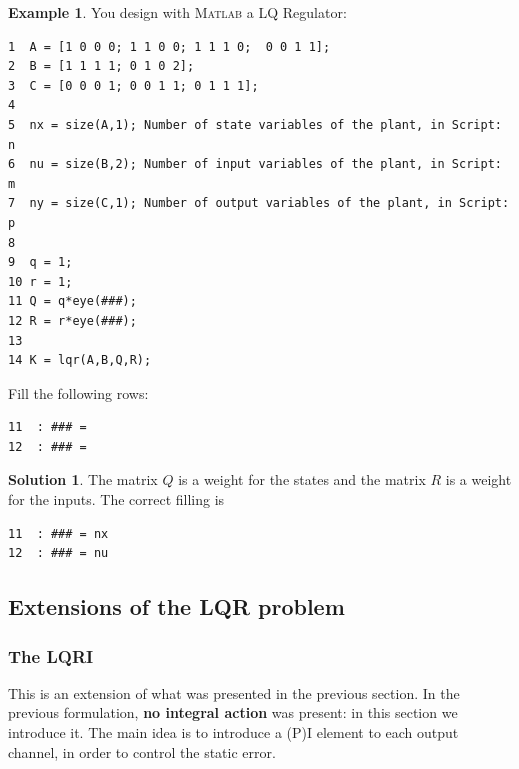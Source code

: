 \documentclass[a4paper,12 pt]{article}
\numberwithin{equation}{section}
\theoremstyle{definition}
\newtheorem{bsp}{Example}
\theoremstyle{remark}
\theoremstyle{definition}
\newtheorem*{lsg}{Solution}
\theoremstyle{definition}
\theoremstyle{definition}
\theoremstyle{remark}
\begin{document}
\newpage

\begin{bsp}
You design with \textsc{Matlab} a LQ Regulator:
\begin{verbatim}
1  A = [1 0 0 0; 1 1 0 0; 1 1 1 0;  0 0 1 1];
2  B = [1 1 1 1; 0 1 0 2];
3  C = [0 0 0 1; 0 0 1 1; 0 1 1 1];
4
5  nx = size(A,1); Number of state variables of the plant, in Script: n
6  nu = size(B,2); Number of input variables of the plant, in Script: m
7  ny = size(C,1); Number of output variables of the plant, in Script: p
8 
9  q = 1;
10 r = 1;
11 Q = q*eye(###);
12 R = r*eye(###);
13
14 K = lqr(A,B,Q,R);

\end{verbatim}
Fill the following rows:\\
\begin{verbatim}
11  : ### = 
12  : ### = 
\end{verbatim}
\newpage
\begin{lsg}
The matrix $Q$ is a weight for the states and the matrix $R$ is a weight for the inputs. The correct filling is
\begin{verbatim}
11  : ### = nx 
12  : ### = nu
\end{verbatim}
\end{lsg}

\end{bsp}
\newpage

\subsection{Extensions of the LQR problem}
\subsubsection{The LQRI}
This is an extension of what was presented in the previous section. In the previous formulation, \textbf{no integral action} was present: in this section we introduce it. The main idea is to introduce a (P)I element to each output channel, in order to control the static error.
\end{document}
